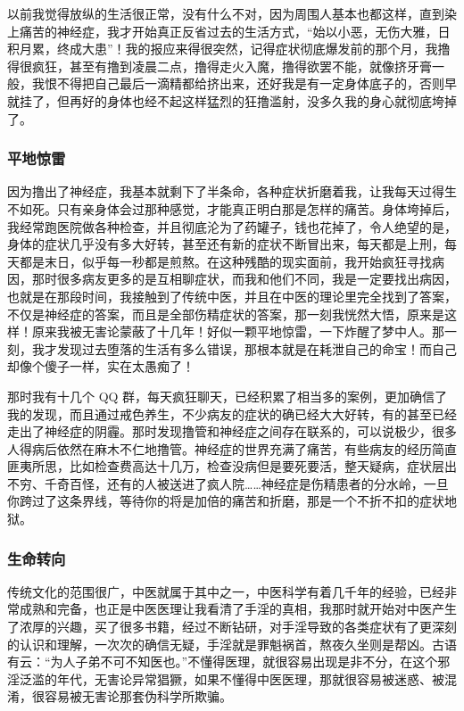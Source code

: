 以前我觉得放纵的生活很正常，没有什么不对，因为周围人基本也都这样，直到染上痛苦的神经症，我才开始真正反省过去的生活方式，“始以小恶，无伤大雅，日积月累，终成大患”！我的报应来得很突然，记得症状彻底爆发前的那个月，我撸得很疯狂，甚至有撸到凌晨二点，撸得走火入魔，撸得欲罢不能，就像挤牙膏一般，我恨不得把自己最后一滴精都给挤出来，还好我是有一定身体底子的，否则早就挂了，但再好的身体也经不起这样猛烈的狂撸滥射，没多久我的身心就彻底垮掉了。

\subsubsection{平地惊雷}

因为撸出了神经症，我基本就剩下了半条命，各种症状折磨着我，让我每天过得生不如死。只有亲身体会过那种感觉，才能真正明白那是怎样的痛苦。身体垮掉后，我经常跑医院做各种检查，并且彻底沦为了药罐子，钱也花掉了，令人绝望的是，身体的症状几乎没有多大好转，甚至还有新的症状不断冒出来，每天都是上刑，每天都是末日，似乎每一秒都是煎熬。在这种残酷的现实面前，我开始疯狂寻找病因，那时很多病友更多的是互相聊症状，而我和他们不同，我是一定要找出病因，也就是在那段时间，我接触到了传统中医，并且在中医的理论里完全找到了答案，不仅是神经症的答案，而且是全部伤精症状的答案，那一刻我恍然大悟，原来是这样！原来我被无害论蒙蔽了十几年！好似一颗平地惊雷，一下炸醒了梦中人。那一刻，我才发现过去堕落的生活有多么错误，那根本就是在耗泄自己的命宝！而自己却像个傻子一样，实在太愚痴了！

那时我有十几个 QQ 群，每天疯狂聊天，已经积累了相当多的案例，更加确信了我的发现，而且通过戒色养生，不少病友的症状的确已经大大好转，有的甚至已经走出了神经症的阴霾。那时发现撸管和神经症之间存在联系的，可以说极少，很多人得病后依然在麻木不仁地撸管。神经症的世界充满了痛苦，有些病友的经历简直匪夷所思，比如检查费高达十几万，检查没病但是要死要活，整天疑病，症状层出不穷、千奇百怪，还有的人被送进了疯人院……神经症是伤精患者的分水岭，一旦你跨过了这条界线，等待你的将是加倍的痛苦和折磨，那是一个不折不扣的症状地狱。

\subsubsection{生命转向}

传统文化的范围很广，中医就属于其中之一，中医科学有着几千年的经验，已经非常成熟和完备，也正是中医医理让我看清了手淫的真相，我那时就开始对中医产生了浓厚的兴趣，买了很多书籍，经过不断钻研，对手淫导致的各类症状有了更深刻的认识和理解，一次次的确信无疑，手淫就是罪魁祸首，熬夜久坐则是帮凶。古语有云：“为人子弟不可不知医也。”不懂得医理，就很容易出现是非不分，在这个邪淫泛滥的年代，无害论异常猖獗，如果不懂得中医医理，那就很容易被迷惑、被混淆，很容易被无害论那套伪科学所欺骗。

